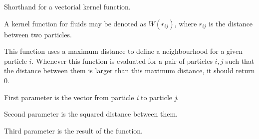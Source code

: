 Shorthand for a vectorial kernel function. 

A kernel function for fluids may be denoted as $W(r_{ij})$, where $r_{ij}$ is the distance between two particles.

This function uses a maximum distance to define a neighbourhood for a given particle $i$. Whenever this function is evaluated for a pair of particles $i, j$ such that the distance between them is larger than this maximum distance, it should return 0.


\begin{DoxyItemize}
\item First parameter is the vector from particle {\itshape i} to particle {\itshape j}.
\item Second parameter is the squared distance between them.
\item Third parameter is the result of the function. 
\end{DoxyItemize}
